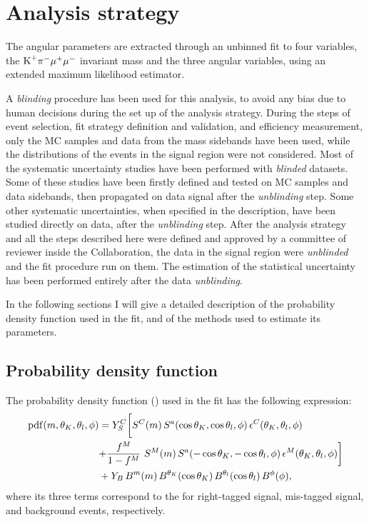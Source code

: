 \chapter{Analysis strategy} \label{sec:fit}

The angular parameters are extracted through an unbinned fit to four variables, the $\textrm{K}^{+}\pi^{-}\mu^{+}\mu^{-}$ invariant mass and the three angular variables, using an extended maximum likelihood estimator.

A \textit{blinding} procedure has been used for this analysis, to avoid any bias due to human decisions during the set up of the analysis strategy.
During the steps of event selection, fit strategy definition and validation, and efficiency measurement, only the MC samples and data from the mass sidebands have been used, while the distributions of the events in the signal region were not considered.
Most of the systematic uncertainty studies have been performed with \textit{blinded} datasets.
Some of these studies have been firstly defined and tested on MC samples and data sidebands, then propagated on data signal after the \textit{unblinding} step.
Some other systematic uncertainties, when specified in the description, have been studied directly on data, after the \textit{unblinding} step.
After the analysis strategy and all the steps described here were defined and approved by a committee of reviewer inside the Collaboration, the data in the signal region were \textit{unblinded} and the fit procedure run on them.
The estimation of the statistical uncertainty has been performed entirely after the data \textit{unblinding}.

In the following sections I will give a detailed description of the probability density function used in the fit, and of the methods used to estimate its parameters.

\section{Probability density function}
\label{sec:TotalPDF}

The probability density function (\pdf) used in the fit has the following expression:
\begin{equation} \label{eq:angALL}
  \begin{split}
    \mathrm{pdf}(m,\theta_K,\theta_l,\phi) & = Y^{C}_{S} \biggl[ S^{C}(m)  \, S^a(\cos\theta_K,\cos\theta_l,\phi) \, \epsilon^{C}(\theta_K,\theta_l,\phi) \biggr. \\
      & \biggl. + \frac{f^{M}}{1-f^{M}}~S^{M}(m) \, S^a(-\cos\theta_K,-\cos\theta_l,\phi) \, \epsilon^{M}(\theta_K,\theta_l,\phi) \biggr] \\
    & + Y_{B}\,B^m(m) \, B^{\theta_K}(\cos\theta_K) \, B^{\theta_l}(\cos\theta_l) \, B^{\phi}(\phi), \\
  \end{split}
\end{equation}
where its three terms correspond to the \pdfs for right-tagged signal, mis-tagged signal, and background events, respectively.

